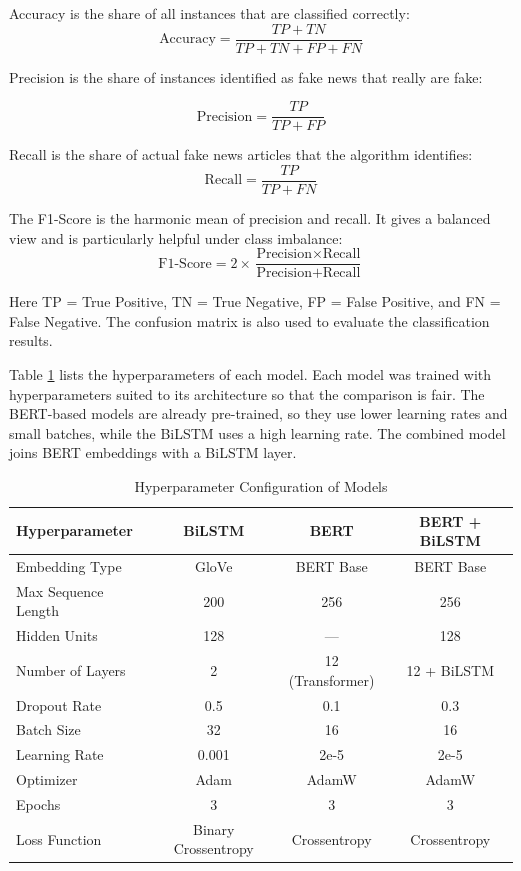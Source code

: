 \documentclass[runningheads]{llncs}
\begin{document}
Accuracy is the share of all instances that are classified correctly:
\[
\text{Accuracy} = \frac{TP + TN}{TP + TN + FP + FN}
\]

Precision is the share of instances identified as fake news that really are fake:

\[
\text{Precision} = \frac{TP}{TP + FP}
\]

Recall is the share of actual fake news articles that the algorithm identifies:
\[
\text{Recall} = \frac{TP}{TP + FN}
\]

The F1-Score is the harmonic mean of precision and recall. It gives a balanced view and is particularly helpful under class imbalance:
\[
\text{F1-Score} = 2 \times \frac{\text{Precision} \times \text{Recall}}{\text{Precision} + \text{Recall}}
\]

Here TP = True Positive, TN = True Negative, FP = False Positive, and FN = False Negative. The confusion matrix is also used to evaluate the classification results.

Table \ref{tab:hyperparameters} lists the hyperparameters of each model. Each model was trained with hyperparameters suited to its architecture so that the comparison is fair. The BERT-based models are already pre-trained, so they use lower learning rates and small batches, while the BiLSTM uses a high learning rate. The combined model joins BERT embeddings with a BiLSTM layer.

\begin{table}[H]
\centering
\caption{Hyperparameter Configuration of Models}
\label{tab:hyperparameters}
\small
\begin{tabular}{|l|c|c|c|}
\hline
\textbf{Hyperparameter} & \textbf{BiLSTM} & \textbf{BERT} & \textbf{BERT + BiLSTM} \\ \hline
Embedding Type & GloVe & BERT Base & BERT Base \\ \hline
Max Sequence Length & 200 & 256 & 256 \\ \hline
Hidden Units & 128 & --- & 128 \\ \hline
Number of Layers & 2 & 12 (Transformer) & 12 + BiLSTM \\ \hline
Dropout Rate & 0.5 & 0.1 & 0.3 \\ \hline
Batch Size & 32 & 16 & 16 \\ \hline
Learning Rate & 0.001 & 2e-5 & 2e-5 \\ \hline
Optimizer & Adam & AdamW & AdamW \\ \hline
Epochs & 3 & 3 & 3 \\ \hline
Loss Function & Binary Crossentropy & Crossentropy & Crossentropy \\ \hline
\end{tabular}
\end{table}
\end{document}
